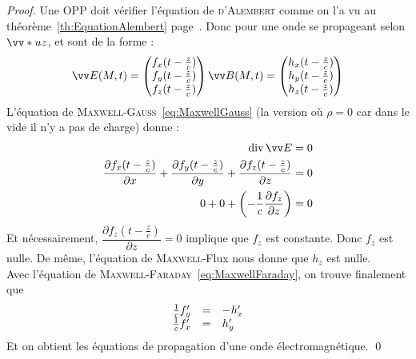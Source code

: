 \documentclass[11pt,a4paper,fleqn,pdftex]{report}
\begin{document}
\begin{proof}
   Une \gls{OPP} doit vérifier l'équation de \textsc{d'Alembert} comme on l'a vu au théorème~\ref{th:EquationAlembert} page~\pageref{th:EquationAlembert}. Donc pour une onde se propageant selon $\vv*{u}{z}$, \E{} et \B{} sont de la forme :
   \begin{equation*}
     \E (M,t) = \begin{pmatrix}
     f_x(t-\frac{z}{c}) \\ f_y(t-\frac{z}{c}) \\f_z(t-\frac{z}{c})
   \end{pmatrix}
   \\
   \B (M,t) = \begin{pmatrix}
     h_x(t-\frac{z}{c}) \\ h_y(t-\frac{z}{c}) \\h_z(t-\frac{z}{c})
   \end{pmatrix}
   \end{equation*}
   L'équation de \textsc{Maxwell-Gauss}~\eqref{eq:MaxwellGauss} (la version où $\rho = 0$ car dans le vide il n'y a pas de charge) donne :
   \begin{align*}
    \diverg \E &= 0 \\
    \dfrac{\partial f_x(t-\frac{z}{c})}{\partial x} + \dfrac{\partial f_y(t-\frac{z}{c})}{\partial y} + \dfrac{\partial f_z(t-\frac{z}{c})}{\partial z} &= 0 \\
    0 + 0 + \left( -\frac{1}{c} \dfrac{\partial f_z}{\partial z} \right) &= 0
   \end{align*}
   Et nécessairement, $\dfrac{\partial f_z(t- \frac{z}{c})}{\partial z} = 0$ implique que $f_z$ est constante. Donc $f_z$ est nulle. De même, l'équation de \textsc{Maxwell}-Flux nous donne que $h_z$ est nulle. \\

   Avec l'équation de \textsc{Maxwell}-\textsc{Faraday}~\eqref{eq:MaxwellFaraday}, on trouve finalement que 
   \[
     \begin{array}{r c l}
     \frac{1}{c} f'_y &=& -h'_x \\
     \frac{1}{c} f'_x &=& h'_y
     \end{array}
   \]
   Et on obtient les équations de propagation d'une onde électromagnétique. \qed
\end{proof}
\end{document}

